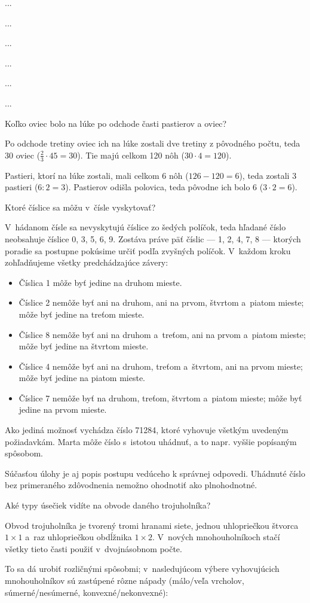 ﻿{%
...}

{%
...}

{%
...}

{%
...}

{%
...}

{%
...}

{%
\napad
Koľko oviec bolo na lúke po odchode časti pastierov a oviec?

\riesenie
Po odchode tretiny oviec ich na lúke zostali dve tretiny z pôvodného počtu, teda 30 oviec ($\frac23\cdot45=30$).
Tie majú celkom 120 nôh ($30\cdot4=120$).

Pastieri, ktorí na lúke zostali, mali celkom 6 nôh ($126-120=6$), teda zostali 3 pastieri ($6:2=3$).
Pastierov odišla polovica, teda pôvodne ich bolo 6 ($3\cdot2=6$).
}

{%
\napad
Ktoré číslice sa môžu v~čísle vyskytovať?

\riesenie
V~hádanom čísle sa nevyskytujú číslice zo šedých políčok, teda hľadané číslo neobsahuje číslice 0, 3, 5, 6, 9.
Zostáva práve päť číslic --- 1, 2, 4, 7, 8 --- ktorých poradie sa postupne pokúsime určiť podľa zvyšných políčok.
V~každom kroku zohľadňujeme všetky predchádzajúce závery:
\begin{itemize}
\item Číslica 1 môže byť jedine na druhom mieste.
\item Číslice 2 nemôže byť ani na druhom, ani na prvom, štvrtom a~piatom mieste; môže byť jedine na treťom mieste.
\item Číslice 8 nemôže byť ani na druhom a~treťom, ani na prvom a~piatom mieste; môže byť jedine na štvrtom mieste.
\item Číslice 4 nemôže byť ani na druhom, treťom a~štvrtom, ani na prvom mieste; môže byť jedine na piatom mieste.
\item Číslice 7 nemôže byť na druhom, treťom, štvrtom a~piatom mieste; môže byť jedine na prvom mieste.
\end{itemize}

Ako jediná možnosť vychádza číslo 71284, ktoré vyhovuje všetkým uvedeným požiadavkám.
Marta môže číslo s~istotou uhádnuť, a to napr. vyššie popísaným spôsobom.

\poznamka
Súčasťou úlohy je aj popis postupu vedúceho k správnej odpovedi.
Uhádnuté číslo bez primeraného zdôvodnenia nemožno ohodnotiť ako plnohodnotné.
}

{%
\napad
Aké typy úsečiek vidíte na obvode daného trojuholníka?

\riesenie
Obvod trojuholníka je tvorený tromi hranami siete, jednou uhlopriečkou štvorca $1\times1$ a~raz uhlopriečkou obdĺžnika $1\times2$.
V~nových mnohouholníkoch stačí všetky tieto časti použiť v~dvojnásobnom počte.

To sa dá urobiť rozličnými spôsobmi; v~nasledujúcom výbere vyhovujúcich mnohouholníkov sú zastúpené rôzne nápady
(málo/veľa vrcholov, súmerné/nesúmerné, konvexné/nekonvexné):
%
}

